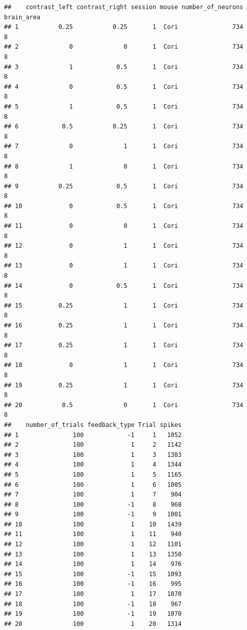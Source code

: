 \documentclass[
]{article}
\begin{document}
\begin{verbatim}
##    contrast_left contrast_right session mouse number_of_neurons brain_area
## 1           0.25           0.25       1  Cori               734          8
## 2              0              0       1  Cori               734          8
## 3              1            0.5       1  Cori               734          8
## 4              0            0.5       1  Cori               734          8
## 5              1            0.5       1  Cori               734          8
## 6            0.5           0.25       1  Cori               734          8
## 7              0              1       1  Cori               734          8
## 8              1              0       1  Cori               734          8
## 9           0.25            0.5       1  Cori               734          8
## 10             0            0.5       1  Cori               734          8
## 11             0              0       1  Cori               734          8
## 12             0              1       1  Cori               734          8
## 13             0              1       1  Cori               734          8
## 14             0            0.5       1  Cori               734          8
## 15          0.25              1       1  Cori               734          8
## 16          0.25              1       1  Cori               734          8
## 17          0.25              1       1  Cori               734          8
## 18             0              1       1  Cori               734          8
## 19          0.25              1       1  Cori               734          8
## 20           0.5              0       1  Cori               734          8
##    number_of_trials feedback_type Trial spikes
## 1               100            -1     1   1052
## 2               100             1     2   1142
## 3               100             1     3   1383
## 4               100             1     4   1344
## 5               100             1     5   1165
## 6               100             1     6   1005
## 7               100             1     7    904
## 8               100            -1     8    968
## 9               100            -1     9   1001
## 10              100             1    10   1439
## 11              100             1    11    940
## 12              100             1    12   1101
## 13              100             1    13   1350
## 14              100             1    14    976
## 15              100            -1    15   1093
## 16              100            -1    16    995
## 17              100             1    17   1070
## 18              100            -1    18    967
## 19              100            -1    19   1070
## 20              100             1    20   1314
\end{verbatim}
\end{document}
